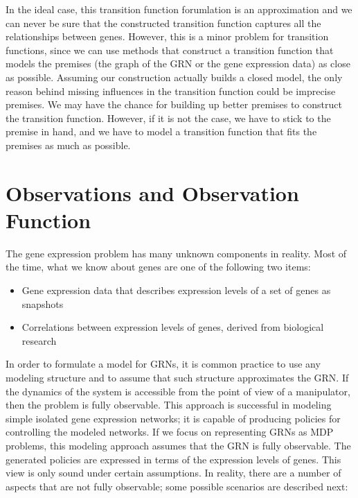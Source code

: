 In the ideal case, this transition function forumlation is an approximation and we can never be sure 
that the constructed transition function captures all the relationships between genes. However, this 
is a minor problem for transition functions, since we can use methods that construct a transition function 
that models the premises (the graph of the GRN or the gene expression data) as close as possible. Assuming 
our construction actually builds a closed model, the only reason behind missing influences in the transition 
function could be imprecise premises. We may have the chance for building up better premises to construct 
the transition function.  However, if it is not the case, we have to stick to the premise in hand, 
and we have to model a transition function that fits the premises as much as possible.

\section{Observations and Observation Function}
\label{section:observation}
The gene expression problem has many unknown components in reality. Most of the time, what we know about
genes are one of the following two items:

\begin{itemize}
  \item Gene expression data that describes expression levels of a set of genes as snapshots
  \item Correlations between expression levels of genes, derived from biological research
\end{itemize}

In order to formulate a model for GRNs, it is common practice to use any modeling structure and to assume
that such structure approximates the GRN. If the dynamics of the system is accessible from the point of view of a manipulator, then the problem is
 fully observable. This approach is successful in modeling simple
isolated gene expression networks; it is capable of producing policies for controlling the modeled networks.
If we focus on representing GRNs as MDP problems, this modeling approach assumes that the GRN is fully
observable. The generated policies are expressed in terms of the expression levels of genes. This view is
only sound under certain assumptions. In reality, there are a number of aspects that are not fully
observable; some possible scenarios are described next:

